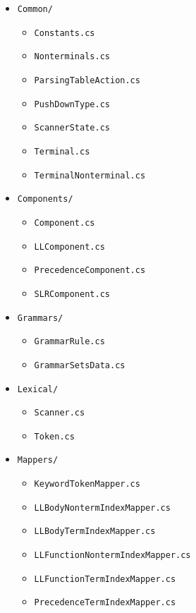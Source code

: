 \begin{itemize}
    \item \verb|Common/|
    \begin{itemize}
        \item \verb|Constants.cs|
        \item \verb|Nonterminals.cs|
        \item \verb|ParsingTableAction.cs|
        \item \verb|PushDownType.cs|
        \item \verb|ScannerState.cs|
        \item \verb|Terminal.cs|
        \item \verb|TerminalNonterminal.cs|
    \end{itemize}
    \item \verb|Components/|
    \begin{itemize}
        \item \verb|Component.cs|
        \item \verb|LLComponent.cs|
        \item \verb|PrecedenceComponent.cs|
        \item \verb|SLRComponent.cs|
    \end{itemize}
    \item \verb|Grammars/|
    \begin{itemize}
        \item \verb|GrammarRule.cs|
        \item \verb|GrammarSetsData.cs|
    \end{itemize}
    \item \verb|Lexical/|
    \begin{itemize}
        \item \verb|Scanner.cs|
        \item \verb|Token.cs|
    \end{itemize}
    \item \verb|Mappers/|
    \begin{itemize}
        \item \verb|KeywordTokenMapper.cs|
        \item \verb|LLBodyNontermIndexMapper.cs|
        \item \verb|LLBodyTermIndexMapper.cs|
        \item \verb|LLFunctionNontermIndexMapper.cs|
        \item \verb|LLFunctionTermIndexMapper.cs|
        \item \verb|PrecedenceTermIndexMapper.cs|

\end{itemize}
\end{itemize}

